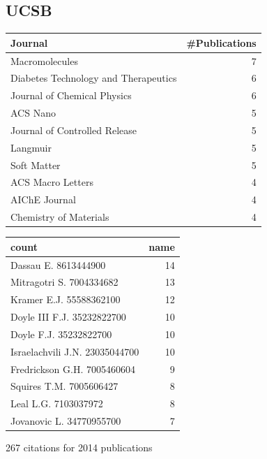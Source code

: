 \documentclass[11pt]{article}
\begin{document}
\subsection{UCSB}
\label{sec-1-16}
\begin{center}
\begin{tabular}{lr}
Journal & \#Publications\\
\hline
Macromolecules & 7\\
Diabetes Technology and Therapeutics & 6\\
Journal of Chemical Physics & 6\\
ACS Nano & 5\\
Journal of Controlled Release & 5\\
Langmuir & 5\\
Soft Matter & 5\\
ACS Macro Letters & 4\\
AIChE Journal & 4\\
Chemistry of Materials & 4\\
\end{tabular}
\end{center}

\begin{center}
\begin{tabular}{lr}
count & name\\
\hline
Dassau E. 8613444900 & 14\\
Mitragotri S. 7004334682 & 13\\
Kramer E.J. 55588362100 & 12\\
Doyle III F.J. 35232822700 & 10\\
Doyle F.J. 35232822700 & 10\\
Israelachvili J.N. 23035044700 & 10\\
Fredrickson G.H. 7005460604 & 9\\
Squires T.M. 7005606427 & 8\\
Leal L.G. 7103037972 & 8\\
Jovanovic L. 34770955700 & 7\\
\end{tabular}
\end{center}

267 citations for 2014 publications
\end{document}
